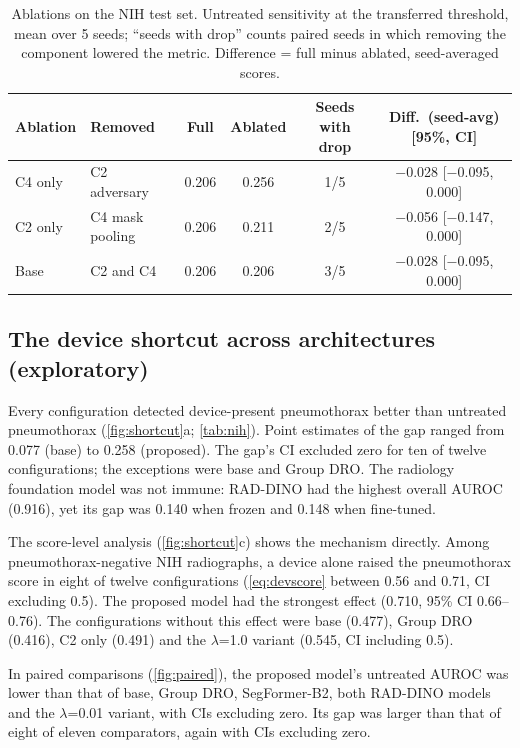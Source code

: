 \documentclass[final,3p]{elsarticle}
\newcommand{\ci}[2]{\scriptsize[#1, #2]}
\begin{document}
\begin{table}[!tbp]
\centering\small
\caption{Ablations on the NIH test set. Untreated sensitivity at the transferred threshold, mean over 5 seeds; ``seeds with drop'' counts paired seeds in which removing the component lowered the metric. Difference = full minus ablated, seed-averaged scores.}
\label{tab:ablation}
\begin{tabular}{@{}l l c c c c@{}}
\toprule
Ablation & Removed & Full & Ablated & Seeds with drop & Diff.\ (seed-avg) \ci{95\%}{CI} \\
\midrule
C4 only & C2 adversary & 0.206 & 0.256 & 1/5 & $-$0.028 \ci{$-$0.095}{0.000} \\
C2 only & C4 mask pooling & 0.206 & 0.211 & 2/5 & $-$0.056 \ci{$-$0.147}{0.000} \\
Base & C2 and C4 & 0.206 & 0.206 & 3/5 & $-$0.028 \ci{$-$0.095}{0.000} \\
\bottomrule
\end{tabular}
\end{table}

\subsection{The device shortcut across architectures (exploratory)}
\label{sec:res-shortcut}
Every configuration detected device-present pneumothorax better than untreated pneumothorax (\cref{fig:shortcut}a; \cref{tab:nih}). Point estimates of the gap ranged from 0.077 (base) to 0.258 (proposed). The gap's CI excluded zero for ten of twelve configurations; the exceptions were base and Group DRO. The radiology foundation model was not immune: RAD-DINO had the highest overall AUROC (0.916), yet its gap was 0.140 when frozen and 0.148 when fine-tuned.

The score-level analysis (\cref{fig:shortcut}c) shows the mechanism directly. Among pneumothorax-negative NIH radiographs, a device alone raised the pneumothorax score in eight of twelve configurations (\cref{eq:devscore} between 0.56 and 0.71, CI excluding 0.5). The proposed model had the strongest effect (0.710, 95\% CI 0.66--0.76). The configurations without this effect were base (0.477), Group DRO (0.416), C2 only (0.491) and the $\lambda$=1.0 variant (0.545, CI including 0.5).

In paired comparisons (\cref{fig:paired}), the proposed model's untreated AUROC was lower than that of base, Group DRO, SegFormer-B2, both RAD-DINO models and the $\lambda$=0.01 variant, with CIs excluding zero. Its gap was larger than that of eight of eleven comparators, again with CIs excluding zero.
\end{document}
